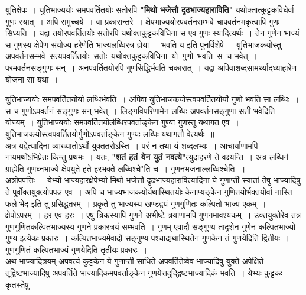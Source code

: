 \documentclass[11pt, openany]{book}
\begin{document}
 युतिक्षेपः~। युतिभाज्ययोः समपवर्तितयोः सतोरपि \hyperref[27]{\textbf{"मिथो भजेत्तौ दृढभाज्यहाराविति"}} यथोक्तात्कुट्टकविधेर्वा गुणः स्यात्~। अपि समुच्चये~। वा प्रकारान्तरे~। क्षेपभाज्ययोरपवर्तनसम्भवे चापवर्तनमकृत्वापि गुणः सिध्यति~। यद्वा तयोरपवर्तितयोः सतोरपि यथोक्तकुट्टकविधिना स एव गुणः स्यादित्यर्थः~। तेन गुणेन भाज्यं स गुणस्य क्षेपेण संयोज्य 
हरेणेति भाज्यलब्धिरत्र ज्ञेया~। भवति य इति पुनर्विशेषे~। युतिभाजकयोस्तु
अपवर्तनसम्भवे \,सत्यपवर्तितयोः \,सतोः \,यथोक्तकुट्टकविधिना \,यो \,गुणो \,भवति \,स \,च भवेत्~। परमवर्तनसङ्गुणः सन्~। अनपवर्तितयोरपि गुणसिद्धिर्भवति चकारात्~। यद्वा अपिवाशब्दसामर्थ्यादध्याहारेण योजना सा यथा~।

\newpage%

\noindent युतिभाज्ययोः समपवर्तितयोर्या लब्धिर्भवति~। अपिवा युतिभाजकयोस्त्वपवर्तितयोर्यो गुणो भवति सा लब्धिः~। स च गुणोऽपवर्तनं सङ्गुणः सन् भवेत्~। लिङ्गविपरिणामेन लब्धिः अपवर्तनसङ्गुणा सती भवेदिति योज्यम्~। 
युतिभाज्ययोः समपवर्तितयोर्लब्धिरपवर्ताङ्केन गुण्या गुणस्तु यथागत एव~।
युतिभाजकयोस्त्वपवर्तितयोर्गुणोऽपवर्ताङ्केन गुण्यः लब्धिः यथागतौ वेत्यर्थः~॥ \\

\vspace{-3mm}
 अत्र यद्वेत्यादिना व्याख्यातोऽर्थो युक्ततरोऽस्ति~। परं न तथा यं शब्दलभ्यः~। आचार्याणामपि नायमर्थोऽभिप्रेतः किन्तु प्रथमः~। यतः, \hyperref[Ex 23]{\textbf{"शतं हतं येन युतं नवत्ये"}}त्युदाहरणे ते वक्ष्यन्ति~। अत्र लब्धिर्न
ग्राह्येति गुणघ्नभाज्ये क्षेपयुते हते हरभक्ते लब्धिश्चे"ति च~। गुणनभजनाल्लब्धिश्चेति~॥ \\

\vspace{-3mm}
 अत्रोपपत्तिः~। येभ्यो भाज्यहारक्षेपेभ्यो मिथो भजेत्तौ दृढभाज्यहारावित्यादिना ये गुणाप्ती स्यातां तेषु भाज्यादिषु ते पूर्वोक्तयुक्त्योपपन्न एव~। 
अपि च भाज्यभाजकयोर्यथास्थितयोः केनाप्यङ्केन गुणितयोर्भक्तयोर्वा नास्ति
फले भेद इति तु प्रसिद्धतरम्~। प्रकृते तु भाज्यस्य खण्डद्वयं गुणगुणितः कल्पितो भाज्य एकम्~। क्षेपोऽपरम्~। हर एव हरः~। एषु त्रिकस्यापि 
गुणने अभीष्टे त्रयाणामपि गुणनमावश्यकम्~। उक्तयुक्तेरेव तत्र गुणगुणितकल्पितभाज्यस्य गुणने प्रकारत्रयं सम्भवति~। गुणम् एवादौ सङ्गुण्य तादृशेन 
गुणेन कल्पितभाज्यो गुण्य इत्येकः प्रकारः~। कल्पितभाज्यमेवादौ 
सङ्गुण्य पश्चाद्यथास्थितेन गुणकेन तं गुणयेदिति द्वितीयः~। गुणगुणितं 
कल्पितभाज्यं गुणयेदिति तृतीयः प्रकारः~। \\

\vspace{-3mm}
 अथ भाज्यादित्रयम् अपवर्त्य कुट्टकेन ये गुणाप्ती साधिते अपवर्तितेष्वेव 
भाज्यादिषु युक्ते अपेक्षिते तूद्विष्टभाज्यादिषु अपवर्तिते भाज्यादिकमपवर्ताङ्केन गुणयेत्तदुद्द्विष्टभाज्यादिकं भवति~। येभ्यः कुट्टकः कृतस्तेषु
\end{document}
